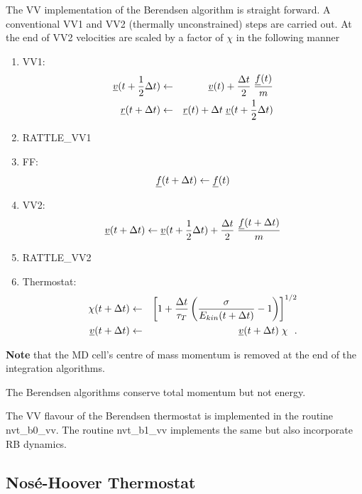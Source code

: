 The VV implementation of the Berendsen algorithm is straight forward.
A conventional VV1 and VV2 (thermally unconstrained) steps are
carried out.  At the end of VV2 velocities are scaled by a factor
of $\chi$ in the following manner
\begin{enumerate}
\item VV1:
\begin{eqnarray}
\mbox{$\underline{v}$}(t + {1 \over 2} \Delta t) &\leftarrow& \mbox{$\underline{v}$}(t) +
{\Delta t \over 2} \; {\mbox{$\underline{f}$}(t) \over m} \nonumber \\
\mbox{$\underline{r}$}(t + \Delta t) &\leftarrow& \mbox{$\underline{r}$}(t) + \Delta t \;
\mbox{$\underline{v}$}(t + {1 \over 2} \Delta t)
\end{eqnarray}
\item RATTLE\_VV1
\item FF:
\begin{equation}
\mbox{$\underline{f}$}(t + \Delta t) \leftarrow \mbox{$\underline{f}$}(t)
\end{equation}
\item VV2:
\begin{equation}
\mbox{$\underline{v}$}(t + \Delta t) \leftarrow \mbox{$\underline{v}$}(t + {1 \over 2} \Delta t) +
{\Delta t \over 2} \; {\mbox{$\underline{f}$}(t + \Delta t) \over m}
\end{equation}
\item RATTLE\_VV2
\item Thermostat:
\begin{eqnarray}
\chi (t + \Delta t) &\leftarrow& \left[ 1 + {\Delta t \over \tau_{T}}
\left( {\sigma \over E_{kin}(t + \Delta t)} - 1 \right) \right]^{1/2} \nonumber \\
\mbox{$\underline{v}$}(t + \Delta t) &\leftarrow& \mbox{$\underline{v}$}(t + \Delta t) \; \chi~~.
\end{eqnarray}
\end{enumerate}

{\bf Note} that the MD cell's centre of mass momentum is removed
at the end of the integration algorithms.

The Berendsen algorithms conserve total momentum but not energy.

The VV flavour of the Berendsen thermostat is implemented in
the \D routine {\sc nvt\_b0\_vv}.
The routine {\sc nvt\_b1\_vv} implements the
same but also incorporate RB dynamics.

\subsection{Nos\'e-Hoover Thermostat}


